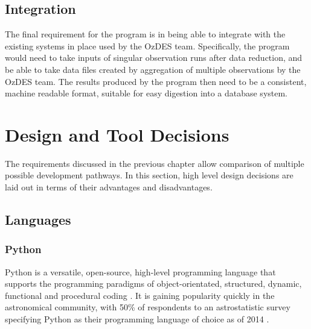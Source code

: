 \documentclass[titlesmallcaps, examinerscopy, copyrightpage]{uqthesis}
\begin{document}
\section{Integration}

The final requirement for the program is in being able to integrate with the existing systems in place used by the OzDES team. Specifically, the program would need to take inputs of singular observation runs after data reduction, and be able to take data files created by aggregation of multiple observations by the OzDES team. The results produced by the program then need to be a consistent, machine readable format, suitable for easy digestion into a database system.










































\chapter{Design and Tool Decisions}
\label{ch:design}

The requirements discussed in the previous chapter allow comparison of multiple possible development pathways. In this section, high level design decisions are laid out in terms of their advantages and disadvantages. 

\section{Languages}

\subsection{Python}

Python is a versatile, open-source, high-level programming language that supports the programming paradigms of object-orientated, structured, dynamic, functional and procedural coding \cite{Python}. It is gaining popularity quickly in the astronomical community, with 50\% of respondents to an astrostatistic survey specifying Python as their programming language of choice as of 2014 \cite{PythonPop}.
\end{document}
